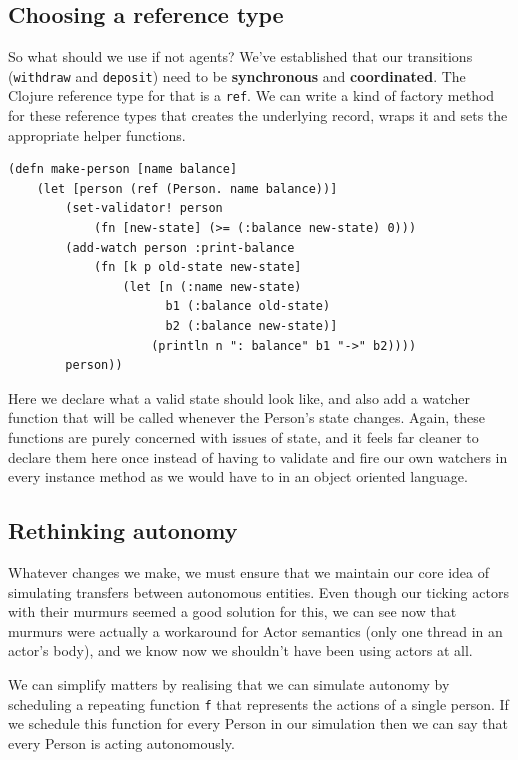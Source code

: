 \documentclass[a4paper,12pt]{kth-mag}
\begin{document}
\subsection{Choosing a reference type}

So what should we use if not agents? We've established that our transitions (\texttt{withdraw} and \texttt{deposit}) need to be \textbf{synchronous} and \textbf{coordinated}. The Clojure reference type for that is a \texttt{ref}. We can write a kind of factory method for these reference types that creates the underlying record, wraps it and sets the appropriate helper functions.

\begin{listing}[H]
	\begin{verbatim}
(defn make-person [name balance]
    (let [person (ref (Person. name balance))]
        (set-validator! person 
            (fn [new-state] (>= (:balance new-state) 0)))
        (add-watch person :print-balance
            (fn [k p old-state new-state] 
                (let [n (:name new-state)
                      b1 (:balance old-state)
                      b2 (:balance new-state)]
                    (println n ": balance" b1 "->" b2))))
        person))
	\end{verbatim}
\end{listing}

Here we declare what a valid state should look like, and also add a watcher function that will be called whenever the Person's state changes. Again, these functions are purely concerned with issues of state, and it feels far cleaner to declare them here once instead of having to validate and fire our own watchers in every instance method as we would have to in an object oriented language.

\subsection{Rethinking autonomy}

Whatever changes we make, we must ensure that we maintain our core idea of simulating transfers between autonomous entities. Even though our ticking actors with their murmurs seemed a good solution for this, we can see now that murmurs were actually a workaround for Actor semantics (only one thread in an actor's body), and we know now we shouldn't have been using actors at all.

We can simplify matters by realising that we can simulate autonomy by scheduling a repeating function \texttt{f} that represents the actions of a single person. If we schedule this function for every Person in our simulation then we can say that every Person is acting autonomously.
\end{document}
